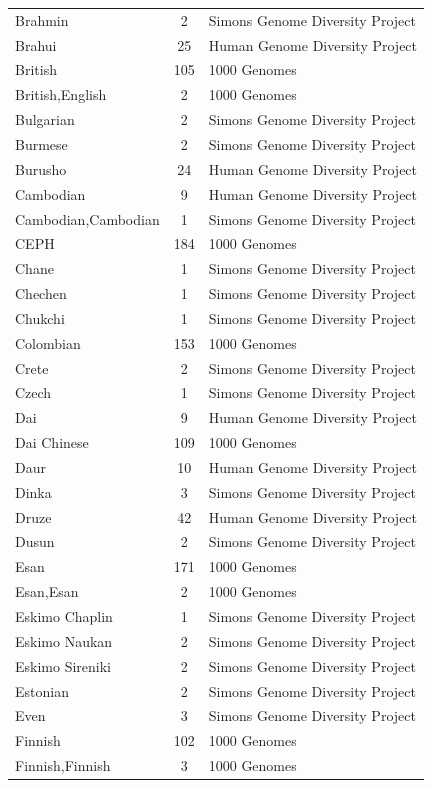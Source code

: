 \begin{longtable}[t]{lcl}
Brahmin & 2 & Simons Genome Diversity Project\\
Brahui & 25 & Human Genome Diversity Project\\
British & 105 & 1000 Genomes\\
British,English & 2 & 1000 Genomes\\
Bulgarian & 2 & Simons Genome Diversity Project\\
Burmese & 2 & Simons Genome Diversity Project\\
Burusho & 24 & Human Genome Diversity Project\\
Cambodian & 9 & Human Genome Diversity Project\\
Cambodian,Cambodian & 1 & Simons Genome Diversity Project\\
CEPH & 184 & 1000 Genomes\\
Chane & 1 & Simons Genome Diversity Project\\
Chechen & 1 & Simons Genome Diversity Project\\
Chukchi & 1 & Simons Genome Diversity Project\\
Colombian & 153 & 1000 Genomes\\
Crete & 2 & Simons Genome Diversity Project\\
Czech & 1 & Simons Genome Diversity Project\\
Dai & 9 & Human Genome Diversity Project\\
Dai Chinese & 109 & 1000 Genomes\\
Daur & 10 & Human Genome Diversity Project\\
Dinka & 3 & Simons Genome Diversity Project\\
Druze & 42 & Human Genome Diversity Project\\
Dusun & 2 & Simons Genome Diversity Project\\
Esan & 171 & 1000 Genomes\\
Esan,Esan & 2 & 1000 Genomes\\
Eskimo Chaplin & 1 & Simons Genome Diversity Project\\
Eskimo Naukan & 2 & Simons Genome Diversity Project\\
Eskimo Sireniki & 2 & Simons Genome Diversity Project\\
Estonian & 2 & Simons Genome Diversity Project\\
Even & 3 & Simons Genome Diversity Project\\
Finnish & 102 & 1000 Genomes\\
Finnish,Finnish & 3 & 1000 Genomes\\

\end{longtable}
